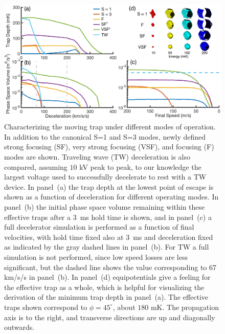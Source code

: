 \begin{figure}[t!]
\includegraphics[width=\linewidth]{Slowing/full-three-panel.png}%
\caption[Traveling Potential Well Characteristics for different Modes]{\label{fig:efftrap}
Characterizing the moving trap under different modes of operation. In addition to the canonical S=1 and S=3 modes, newly defined strong focusing (SF), very strong focusing (VSF), and focusing (F) modes are shown. Traveling wave (TW) deceleration is also compared, assuming $10$ kV peak to peak, to our knowledge the largest voltage used to successfully decelerate to rest with a TW device. In panel~(a) the trap depth at the lowest point of escape is shown as a function of deceleration for different operating modes. In panel~(b) the initial phase space volume remaining within these effective traps after a $3$~ms hold time is shown, and in panel~(c) a full decelerator simulation is performed as a function of final velocities, with hold time fixed also at $3$~ms and deceleration fixed as indicated by the gray dashed lines in panel~(b). For TW a full simulation is not performed, since low speed losses are less significant, but the dashed line shows the value corresponding to 67 km/s/s in panel~(b). In panel~(d) equipotentials give a feeling for the effective trap as a whole, which is helpful for visualizing the derivation of the minimum trap depth in panel~(a). The effective traps shown correspond to $\phi=45^\circ$, about $180\text{ mK}$. The propagation axis is to the right, and transverse directions are up and diagonally outwards.}
\end{figure}

